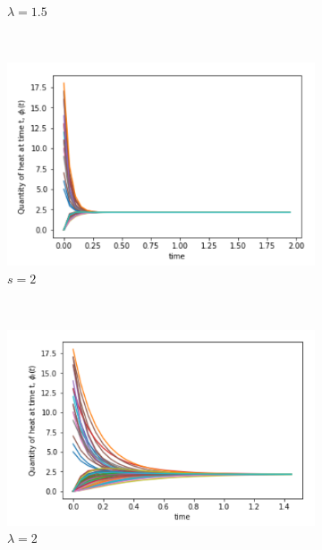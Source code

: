 \documentclass[10pt,a4paper]{article}
\theoremstyle{plain}
\theoremstyle{definition}
\begin{document}
\begin{figure}[H]
\begin{subfigure}[b]{0.45\textwidth}
        		\caption{$\lambda = 1.5$}
        	\end{subfigure}\\
        	\begin{subfigure}[b]{0.45\textwidth}
        		\includegraphics[width= \textwidth]{images/Erdos-Mellin2.png}
        		\caption{$s=2$}
        	\end{subfigure}~
        	\begin{subfigure}[b]{0.45\textwidth}
        		\includegraphics[width= \textwidth]{images/Erdos-Laplace2.png}
        		\caption{$\lambda = 2$}
        	\end{subfigure}\\
        	\begin{subfigure}[b]{0.45\textwidth}

\end{subfigure}
\end{figure}
\end{document}
